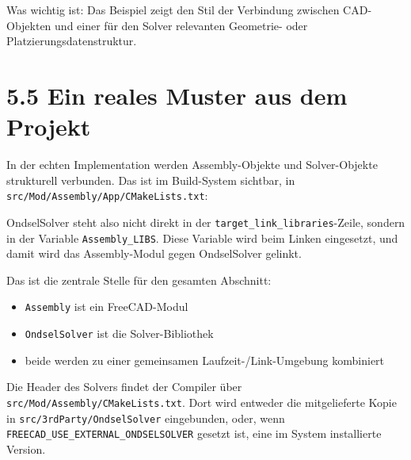 \documentclass[
  12pt
]{book}
\newenvironment{Shaded}{}{}
\newcommand{\BaseNTok}[1]{\textcolor[rgb]{0.25,0.63,0.44}{#1}}
\newcommand{\CommentTok}[1]{\textcolor[rgb]{0.38,0.63,0.69}{\textit{#1}}}
\newcommand{\DecValTok}[1]{\textcolor[rgb]{0.25,0.63,0.44}{#1}}
\newcommand{\KeywordTok}[1]{\textcolor[rgb]{0.00,0.44,0.13}{\textbf{#1}}}
\newcommand{\NormalTok}[1]{#1}
\newcommand{\OtherTok}[1]{\textcolor[rgb]{0.00,0.44,0.13}{#1}}
\providecommand{\tightlist}{%
  \setlength{\itemsep}{0pt}\setlength{\parskip}{0pt}}
\begin{document}
Was wichtig ist: Das Beispiel zeigt den Stil der Verbindung zwischen
CAD-Objekten und einer für den Solver relevanten Geometrie- oder
Platzierungsdatenstruktur.

\hypertarget{ein-reales-muster-aus-dem-projekt}{%
\section{\texorpdfstring{{5.5} Ein reales Muster aus dem
Projekt}{5.5 Ein reales Muster aus dem Projekt}}\label{ein-reales-muster-aus-dem-projekt}}

In der echten Implementation werden Assembly-Objekte und Solver-Objekte
strukturell verbunden. Das ist im Build-System sichtbar, in
\texttt{src/Mod/Assembly/App/CMakeLists.txt}:

\begin{Shaded}
\end{Shaded}

OndselSolver steht also nicht direkt in der
\texttt{target\_link\_libraries}-Zeile, sondern in der Variable
\texttt{Assembly\_LIBS}. Diese Variable wird beim Linken eingesetzt, und
damit wird das Assembly-Modul gegen OndselSolver gelinkt.

Das ist die zentrale Stelle für den gesamten Abschnitt:

\begin{itemize}
\tightlist
\item
  \texttt{Assembly} ist ein FreeCAD-Modul
\item
  \texttt{OndselSolver} ist die Solver-Bibliothek
\item
  beide werden zu einer gemeinsamen Laufzeit-/Link-Umgebung kombiniert
\end{itemize}

Die Header des Solvers findet der Compiler über
\texttt{src/Mod/Assembly/CMakeLists.txt}. Dort wird entweder die
mitgelieferte Kopie in \texttt{src/3rdParty/OndselSolver} eingebunden,
oder, wenn \texttt{FREECAD\_USE\_EXTERNAL\_ONDSELSOLVER} gesetzt ist,
eine im System installierte Version.
\end{document}

